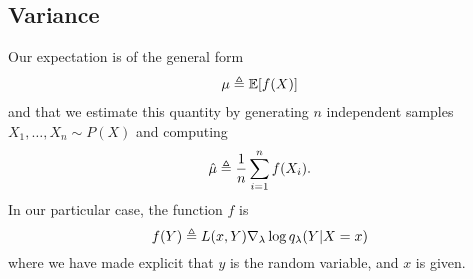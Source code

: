 \subsection{Variance}
Our expectation is of the general form
\begin{align*}
  \mu \triangleq \operatorname{\mathbb{E}} [ f(X) ]
\end{align*}
and that we estimate this quantity by generating $n$ independent samples $X_1,\dots,X_n \sim P(X)$ and computing
\begin{align*}
  \hat{\mu} \triangleq \frac{1}{n} \sum_{i=1}^n f(X_i).
\end{align*}
In our particular case, the function $f$ is
\begin{equation*}
  f(Y) \triangleq L(x,Y) \nabla_{\lambda} \log q_{\lambda}(Y|X=x)
\end{equation*}
where we have made explicit that $y$ is the random variable, and $x$ is given.

